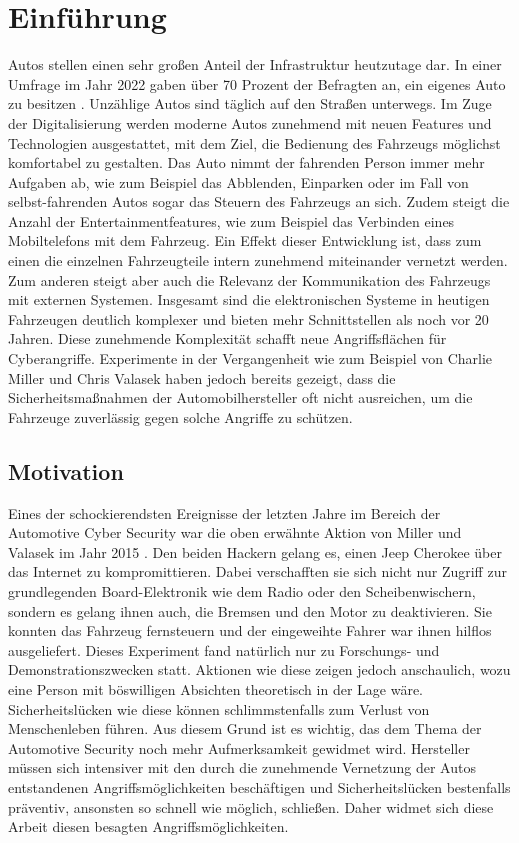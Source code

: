 \chapter{Einführung}

Autos stellen einen sehr großen Anteil der Infrastruktur heutzutage dar. In einer Umfrage im Jahr 2022 gaben über 70 Prozent der Befragten an, ein eigenes Auto zu besitzen \cite[vgl.][]{Statista.2022}. Unzählige Autos sind täglich auf den Straßen unterwegs. Im Zuge der Digitalisierung werden moderne Autos zunehmend mit neuen Features und Technologien ausgestattet, mit dem Ziel, die Bedienung des Fahrzeugs möglichst komfortabel zu gestalten. Das Auto nimmt der fahrenden Person immer mehr Aufgaben ab, wie zum Beispiel das Abblenden, Einparken oder im Fall von selbst-fahrenden Autos sogar das Steuern des Fahrzeugs an sich. Zudem steigt die Anzahl der Entertainmentfeatures, wie zum Beispiel das Verbinden eines Mobiltelefons mit dem Fahrzeug. Ein Effekt dieser Entwicklung ist, dass zum einen die einzelnen Fahrzeugteile intern zunehmend miteinander vernetzt werden. Zum anderen steigt aber auch die Relevanz der Kommunikation des Fahrzeugs mit externen Systemen. Insgesamt sind die elektronischen Systeme in heutigen Fahrzeugen deutlich komplexer und bieten mehr Schnittstellen als noch vor 20 Jahren. Diese zunehmende Komplexität schafft neue Angriffsflächen für Cyberangriffe. Experimente in der Vergangenheit wie zum Beispiel von Charlie Miller und Chris Valasek \cite[vgl.][]{Greenberg.2015} haben jedoch bereits gezeigt, dass die Sicherheitsmaßnahmen der Automobilhersteller oft nicht ausreichen, um die Fahrzeuge zuverlässig gegen solche Angriffe zu schützen.

\section{Motivation}
Eines der schockierendsten Ereignisse der letzten Jahre im Bereich der Automotive Cyber Security war die oben erwähnte Aktion von Miller und Valasek im Jahr 2015 \cite[vgl.][]{Greenberg.2015}. Den beiden Hackern gelang es, einen Jeep Cherokee über das Internet zu kompromittieren. Dabei verschafften sie sich nicht nur Zugriff zur grundlegenden Board-Elektronik wie dem Radio oder den Scheibenwischern, sondern es gelang ihnen auch, die Bremsen und den Motor zu deaktivieren. Sie konnten das Fahrzeug fernsteuern und der eingeweihte Fahrer war ihnen hilflos ausgeliefert. Dieses Experiment fand natürlich nur zu Forschungs- und Demonstrationszwecken statt. Aktionen wie diese zeigen jedoch anschaulich, wozu eine Person mit böswilligen Absichten theoretisch in der Lage wäre. Sicherheitslücken wie diese können schlimmstenfalls zum Verlust von Menschenleben führen. Aus diesem Grund ist es wichtig, das dem Thema der Automotive Security noch mehr Aufmerksamkeit gewidmet wird. Hersteller müssen sich intensiver mit den durch die zunehmende Vernetzung der Autos entstandenen Angriffsmöglichkeiten beschäftigen und Sicherheitslücken bestenfalls präventiv, ansonsten so schnell wie möglich, schließen. Daher widmet sich diese Arbeit diesen besagten Angriffsmöglichkeiten.

